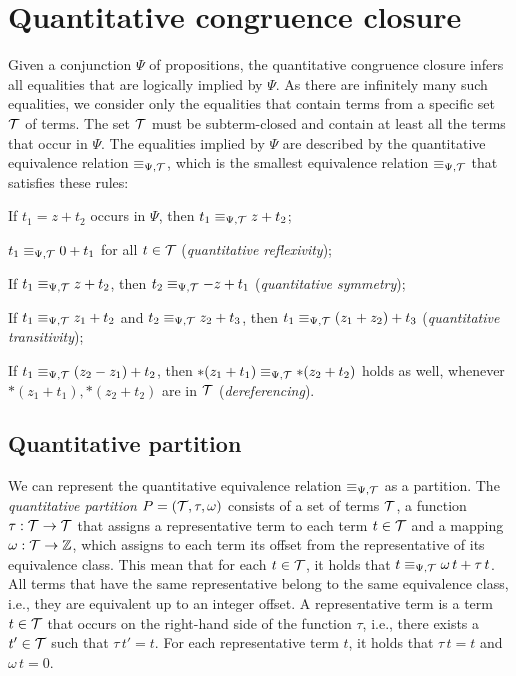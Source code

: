 \section{Quantitative congruence closure}\label{chapter:qcc}

Given a conjunction $\Psi$ of propositions, the quantitative congruence closure infers all equalities that are logically implied by $\Psi$.
As there are infinitely many such equalities, we consider only the equalities that contain terms from a specific set $\mathcal{T}$ of terms.
The set $\mathcal{T}$ must be subterm-closed and contain at least all the terms that occur in $\Psi$.
The equalities implied by $\Psi$ are described by the quantitative equivalence relation $\equiv_{\Psi,\mathcal{T}}$,
which is the smallest equivalence relation $\equiv_{\Psi,\mathcal{T}}$ that satisfies these rules:
\begin{enumerate}[label={[E\arabic*]}, ref={[E\arabic*]}]
  \setcounter{enumi}{-1}
\item\label{item:persistence} If $t_1 = z+t_2$ occurs in $\Psi$, then $t_1 \equiv_{\Psi,\mathcal{T}} z+t_2$;
\item\label{item:quantitative-reflexivity} $t_1 \equiv_{\Psi,\mathcal{T}} 0+t_1$ for all $t\in\mathcal{T}$ (\emph{quantitative reflexivity});
\item\label{item:quantitative-symmetry} If $t_1 \equiv_{\Psi,\mathcal{T}} z+t_2$, then $t_2 \equiv_{\Psi,\mathcal{T}} -z+t_1$ (\emph{quantitative symmetry});
\item\label{item:quantitative-transitivity} If $t_1 \equiv_{\Psi,\mathcal{T}} z_1+t_2$ and $t_2 \equiv_{\Psi,\mathcal{T}} z_2 + t_3$,
		then $t_1 \equiv_{\Psi,\mathcal{T}} (z_1+z_2)+t_3$ (\emph{quantitative transitivity});
\item\label{item:dereferencing} If $t_1 \equiv_{\Psi,\mathcal{T}} (z_2 - z_1) + t_2$, then $*(z_1 + t_1) \equiv_{\Psi,\mathcal{T}} *(z_2 + t_2)$ holds as well, whenever $*(z_1 + t_1),  *(z_2 + t_2)$ are in $\mathcal{T}$ (\emph{dereferencing}).
\end{enumerate}

\subsection{Quantitative partition}\label{subsection:quantitative-union-find}

We can represent the quantitative equivalence relation $\equiv_{\Psi,\mathcal{T}}$ as a partition.
The \emph{quantitative partition} $P = (\mathcal{T}, \tau, \omega)$ consists of a set of terms $\mathcal{T}$,
a function $\tau : \mathcal{T} \rightarrow \mathcal{T}$ that assigns a representative term to each term $t \in \mathcal{T}$ and a mapping $\omega : \mathcal{T} \rightarrow \mathbb{Z}$,
which assigns to each term its offset from the representative of its equivalence class.
This mean that for each $t \in \mathcal{T}$, it holds that $t \equiv_{\Psi,\mathcal{T}} \omega\,t + \tau\,t$.
All terms that have the same representative belong to the same equivalence class, i.e., they are equivalent up to an integer offset.
A representative term is a term $t \in \mathcal{T}$ that occurs on the right-hand side of the function $\tau$,
i.e., there exists a $t'\in \mathcal{T}$ such that $\tau\,t' = t$.
For each representative term $t$, it holds that $\tau\,t=t$ and $\omega\,t = 0$.

